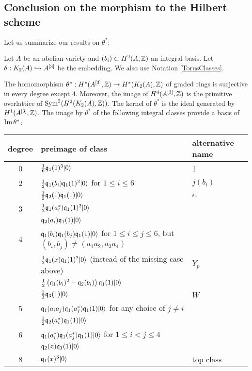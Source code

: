 \subsection{Conclusion on the morphism to the Hilbert scheme}
Let us summarize our results on $\theta^*$:
\begin{theorem}\label{thetaTheorem}
Let $A$ be an abelian variety and $(b_i)\subset H^2(A,\Z)$ an integral basis. Let $\theta: \kum{A}{2}\hookrightarrow A^{[3]}$ be the embedding. We also use Notation \ref{TorusClasses}.

The homomorphism $\theta^*:H^*(A\hilb{3},\Z)\rightarrow H^*(\kum{A}{2},\Z)$ of graded rings is surjective in every degree except $4$. Moreover, the image of $H^4(A\hilb{3},\Z)$ is the primitive overlattice of $\Sym^2(H^2(\kum{A}{2},\Z))$. 
The kernel of $\theta^*$ is the ideal generated by $H^1(A\hilb{3},\Z)$.
The image by $\theta^*$ of the following integral classes provide a basis of $\im\theta^*$:
\begin{center}
\begin{tabular}{c|l|l}
degree & preimage of class & alternative name  \\
\hline
0 & $\frac{1}{6} \q_1(1)^3\vac$ & 1 \\
\hline
2 &  $\frac{1}{2}\q_1(b_i) \q_1(1)^2\vac$ for $1\leq i\leq 6$ & $j(b_i)$ \\
 & $\frac{1}{2} \q_2(1)\q_1(1)\vac $  & $e$\\
\hline
3 & $\frac{1}{2}\q_1(a^*_i)\q_1(1)^2\vac$ & \\
  & $\q_2(a_i)\q_1(1)\vac$ & \\
\hline
4 & $\q_1(b_i)\q_1(b_j)\q_1(1)\vac$ for $1\leq i\leq j\leq 6$, but $(b_i,b_j)\neq(a_1a_2,a_3a_4)$ &\\
  & $\frac{1}{2}\q_1(x)\q_1(1)^2\vac$ (instead of the missing case above)  & $Y_p$\\
  & $\frac{1}{2}\left(\q_1(b_i)^2-\q_2(b_i)\right)\q_1(1)\vac$ & \\
  & $\frac{1}{3} \q_3(1)\vac$ & $W$ \\
\hline
5 & $\q_1(a_ia_j)\q_1(a_j^*)\q_1(1) \vac$ for any choice of $j\neq i$ &\\
  & $\frac{1}{2} \q_2(a^*_i)\q_1(1)\vac $ &\\
\hline
6 & $\q_1(a_i^*)\q_1(a_j^*)\q_1(1)\vac$ for $1\leq i< j\leq 4$ & \\
  & $\q_2(x)\q_1(1)\vac$ & \\
\hline
8 & $\q_1(x)^3\vac$ & top class
\end{tabular}
\end{center}
\end{theorem}
